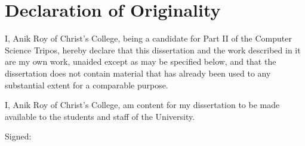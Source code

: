 
\chapter*{Declaration of Originality}

I, Anik Roy of Christ's College, being a candidate for Part II of the Computer Science Tripos, hereby declare that this dissertation and the work described in it are my own work, unaided except as may be specified below, and that the dissertation does not contain material that has already been used to any substantial extent for a comparable purpose.

I, Anik Roy of Christ's College, am content for my dissertation to be made available to the students and staff of the University. 

\bigskip
\noindent Signed: 

\medskip
{}

